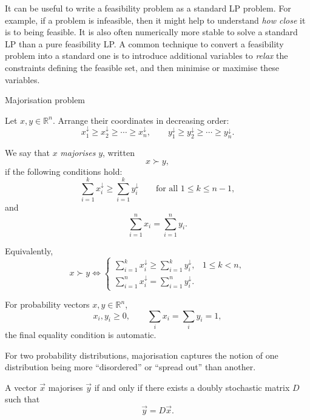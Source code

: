 It can be useful to write a feasibility problem as a standard LP problem. For example, if a problem is infeasible, then it might help to understand \textit{how close} it is to being feasible. It is also often numerically more stable to solve a standard LP than a pure feasibility LP.
A common technique to convert a feasibility problem into a standard one is to introduce additional variables to \textit{relax} the constraints defining the feasible set, and then minimise or maximise these variables.

\begin{prf}{Majorisation problem}

    Let \(x,y \in \mathbb{R}^n\). Arrange their coordinates in decreasing order:
    \[
        x_1^\downarrow \ge x_2^\downarrow \ge \cdots \ge x_n^\downarrow,
        \qquad
        y_1^\downarrow \ge y_2^\downarrow \ge \cdots \ge y_n^\downarrow.
    \]

    We say that \(x\) \textit{majorises} \(y\), written
    \[
        x \succ y,
    \]
    if the following conditions hold:
    \[
        \sum_{i=1}^k x_i^\downarrow
        \ge
        \sum_{i=1}^k y_i^\downarrow
        \qquad \text{for all } 1 \le k \le n-1,
    \]
    and
    \[
        \sum_{i=1}^n x_i
        =
        \sum_{i=1}^n y_i.
    \]

    Equivalently,
    \[
        x \succ y
        \iff
        \begin{cases}
            \displaystyle \sum_{i=1}^k x_i^\downarrow
            \ge
            \sum_{i=1}^k y_i^\downarrow,
             & 1 \le k < n, \\[1.2em]
            \displaystyle \sum_{i=1}^n x_i^\downarrow
            =
            \sum_{i=1}^n y_i^\downarrow.
        \end{cases}
    \]

    For probability vectors \(x,y \in \mathbb{R}^n\),
    \[
        x_i,y_i \ge 0,
        \qquad
        \sum_i x_i = \sum_i y_i = 1,
    \]
    the final equality condition is automatic.

    For two probability distributions, majorisation captures the notion of one distribution being more “disordered” or “spread out” than another.

    A vector $\vec{x}$ majorises $\vec{y}$ if and only if there exists a doubly stochastic matrix $D$ such that
    \[
        \vec{y} = D\vec{x}.
    \]

\end{prf}


